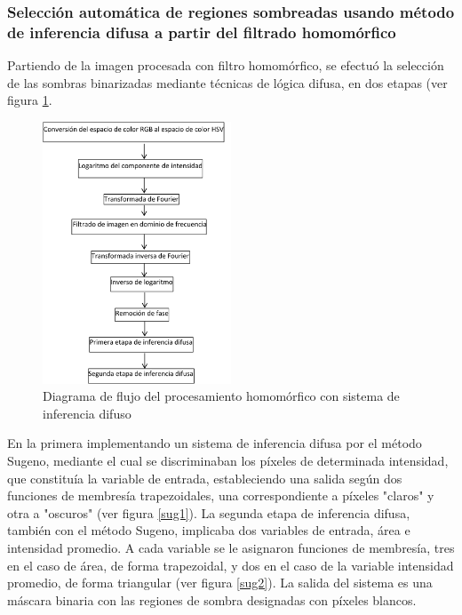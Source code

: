 \subsubsection{Selección automática de regiones sombreadas usando método de inferencia difusa a partir del filtrado homomórfico} \label{metod_homo_fuzzy}
Partiendo de la imagen procesada con filtro homomórfico, se efectuó la selección de las sombras binarizadas mediante técnicas de lógica difusa, en dos etapas (ver figura \ref{flowchart_homofuzzy}. \\

\begin{figure}[h!]
    \centering
    \includegraphics[width=0.5\textwidth]{Imagenes/Homomorfico/flowchart_fuzzy.png}
     \hfill
     \caption{Diagrama de flujo del procesamiento homomórfico con sistema de inferencia difuso}
    \label{flowchart_homofuzzy}
\end{figure}

En la primera implementando un sistema de inferencia difusa por el método Sugeno, mediante el cual se discriminaban los píxeles de determinada intensidad, que constituía la variable de entrada, estableciendo una salida según dos funciones de membresía trapezoidales, una correspondiente a píxeles "claros" y otra a "oscuros" (ver figura \ref{sug1}). La segunda etapa de inferencia difusa, también con el método Sugeno, implicaba dos variables de entrada, área e intensidad promedio. A cada variable se le asignaron funciones de membresía, tres en el caso de área, de forma trapezoidal, y dos en el caso de la variable intensidad promedio, de forma triangular (ver figura \ref{sug2}). La salida del sistema es una máscara binaria con las regiones de sombra designadas con píxeles blancos. 

